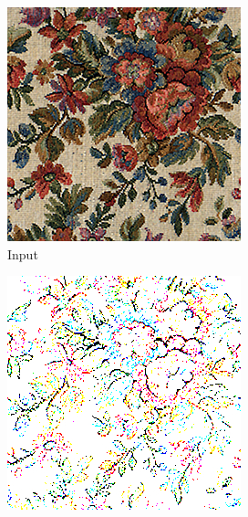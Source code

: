 \begin{figure}[]
\begin{subfigure}{\textwidth}
        \begin{subfigure}{0.24\textwidth}
            \centering
            \includegraphics[width=\textwidth]{images/04-experiment01/flowers/target.jpg}
            \caption*{Input}
        \end{subfigure}
        \hfill
        \begin{subfigure}{0.24\textwidth}
            \centering
            \includegraphics[width=\textwidth]{images/04-experiment01/flowers/threshold_bg.jpg}

\end{subfigure}
\end{subfigure}
\end{figure}
